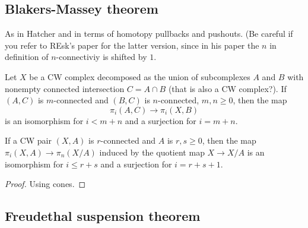 \subsection{Blakers-Massey theorem}

As in Hatcher and in terms of homotopy pullbacks and pushouts. (Be careful if you refer to REsk's paper for the latter version, since in his paper the $n$ in definition of $n$-connectiviy is shifted by $1$.
\begin{theorem}
	Let $X$ be a CW complex decomposed as the union of subcomplexes $A$ and $B$ with nonempty connected intersection $C=A\cap B$ {\color{magenta}(that is also a CW complex?)}. If $(A,C)$ is $m$-connected and $(B,C)$ is $n$-connected, $m,n\geq 0$, then the map
	$$\pi_{i}(A,C)\to \pi_{i}(X,B)$$
is an isomorphism for $i<m+n$ and a surjection for $i=m+n$.
\end{theorem}

\begin{proposition}
	If a CW pair $(X,A)$ is $r$-connected and $A$ is $r,s \geq 0$, then the map $\pi_{i}(X,A)\to \pi_{n}(X/A)$ induced by the quotient map $X\to X/A$ is an isomorphism for $i\leq r+s$ and a surjection for $i=r+s+1$.
\end{proposition}
\begin{proof}
	Using cones.
\end{proof}

\subsection{Freudethal suspension theorem}

